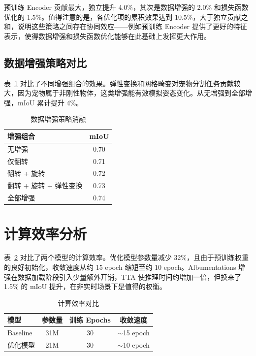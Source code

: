 预训练 Encoder 贡献最大，独立提升 4.0\%，其次是数据增强的 2.0\% 和损失函数优化的 1.5\%。值得注意的是，各优化项的累积效果达到 10.5\%，大于独立贡献之和，说明这些策略之间存在协同效应——例如预训练 Encoder 提供了更好的特征表示，使得数据增强和损失函数优化能够在此基础上发挥更大作用。

\subsection{数据增强策略对比}

表~\ref{tab:augmentation_ablation} 对比了不同增强组合的效果。弹性变换和网格畸变对宠物分割任务贡献较大，因为宠物属于非刚性物体，这类增强能有效模拟姿态变化。从无增强到全部增强，mIoU 累计提升 4\%。

\begin{table}[H]
    \centering
    \caption{数据增强策略消融}
    \label{tab:augmentation_ablation}
    \begin{tabularx}{\textwidth}{Xc}
        \hline
        \textbf{增强组合} & \textbf{mIoU} \\
        \hline
        无增强 & 0.70 \\
        仅翻转 & 0.71 \\
        翻转 + 旋转 & 0.72 \\
        翻转 + 旋转 + 弹性变换 & 0.73 \\
        全部增强 & 0.74 \\
        \hline
    \end{tabularx}
\end{table}

\section{计算效率分析}

表~\ref{tab:efficiency} 对比了两个模型的计算效率。优化模型参数量减少 32\%，且由于预训练权重的良好初始化，收敛速度从约 15 epoch 缩短至约 10 epoch。Albumentations 增强在数据加载阶段引入少量额外开销，TTA 使推理时间约增加一倍，但换来了 1.5\% 的 mIoU 提升，在非实时场景下是值得的权衡。

\begin{table}[H]
    \centering
    \caption{计算效率对比}
    \label{tab:efficiency}
    \begin{tabularx}{\textwidth}{Xccc}
        \hline
        \textbf{模型} & \textbf{参数量} & \textbf{训练 Epochs} & \textbf{收敛速度} \\
        \hline
        Baseline & 31M & 30 & $\sim$15 epoch \\
        优化模型 & 21M & 30 & $\sim$10 epoch \\
        \hline
    \end{tabularx}
\end{table}

